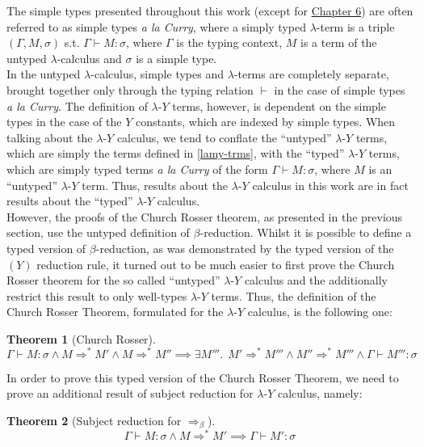 \documentclass[a4paper, 12pt, twoside]{style/ociamthesis}
\theoremstyle{plain}
\newtheorem{Theorem}{Theorem}[chapter]
\theoremstyle{definition}
\theoremstyle{remark}
\newcommand{\lamy}{\lambda\text{-}Y}
\begin{document}
The simple types presented throughout this work (except for
\protect\hyperlink{itypes}{Chapter 6}) are often referred to as simple
types \emph{a la Curry}, where a simply typed \(\lambda\)-term is a
triple \((\Gamma, M, \sigma)\) s.t. \(\Gamma \vdash M : \sigma\), where
\(\Gamma\) is the typing context, \(M\) is a term of the untyped
\(\lambda\)-calculus and \(\sigma\) is a simple type.\\
In the untyped \(\lambda\)-calculus, simple types and \(\lambda\)-terms
are completely separate, brought together only through the typing
relation \(\vdash\) in the case of simple types \emph{a la Curry}. The
definition of \(\lamy\) terms, however, is dependent on the simple types
in the case of the \(Y\) constants, which are indexed by simple types.
When talking about the \(\lamy\) calculus, we tend to conflate the
``untyped'' \(\lamy\) terms, which are simply the terms defined in
\ref{lamy-trms}, with the ``typed'' \(\lamy\) terms, which are simply
typed terms \emph{a la Curry} of the form \(\Gamma \vdash M : \sigma\),
where \(M\) is an ``untyped'' \(\lamy\) term. Thus, results about the
\(\lamy\) calculus in this work are in fact results about the ``typed''
\(\lamy\) calculus.\\
However, the proofs of the Church Rosser theorem, as presented in the
previous section, use the untyped definition of \(\beta\)-reduction.
Whilst it is possible to define a typed version of \(\beta\)-reduction,
as was demonstrated by the typed version of the \((Y)\) reduction rule,
it turned out to be much easier to first prove the Church Rosser theorem
for the so called ``untyped'' \(\lamy\) calculus and the additionally
restrict this result to only well-types \(\lamy\) terms. Thus, the
definition of the Church Rosser Theorem, formulated for the \(\lamy\)
calculus, is the following one:

\begin{Theorem}[Church Rosser]

\[\Gamma \vdash M : \sigma \land M \Rightarrow^* M' \land M \Rightarrow^* M'' \implies \exists M'''.\ \ M' \Rightarrow^* M''' \land M'' \Rightarrow^* M''' \land \Gamma \vdash M''' : \sigma\]

\end{Theorem}

In order to prove this typed version of the Church Rosser Theorem, we
need to prove an additional result of subject reduction for \(\lamy\)
calculus, namely:

\begin{Theorem}[Subject reduction for $\Rightarrow_\beta$]

\[\Gamma \vdash M : \sigma \land M \Rightarrow^* M' \implies \Gamma \vdash M' : \sigma\]

\end{Theorem}
\end{document}
